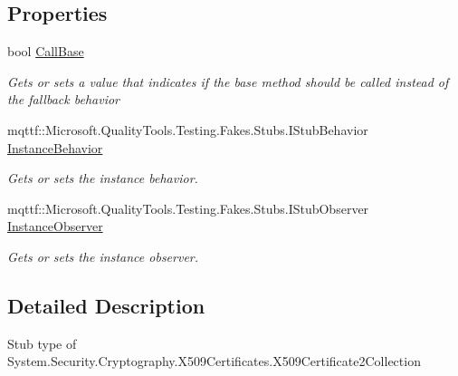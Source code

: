 \subsection*{Properties}
\begin{DoxyCompactItemize}
\item 
bool \hyperlink{class_system_1_1_security_1_1_cryptography_1_1_x509_certificates_1_1_fakes_1_1_stub_x509_certificate2_collection_a594284e1a92cb30adba39edc451be699}{Call\-Base}
\begin{DoxyCompactList}\small\item\em Gets or sets a value that indicates if the base method should be called instead of the fallback behavior\end{DoxyCompactList}\item 
mqttf\-::\-Microsoft.\-Quality\-Tools.\-Testing.\-Fakes.\-Stubs.\-I\-Stub\-Behavior \hyperlink{class_system_1_1_security_1_1_cryptography_1_1_x509_certificates_1_1_fakes_1_1_stub_x509_certificate2_collection_af9fc8c554397ab62fa9246ea78c1a439}{Instance\-Behavior}
\begin{DoxyCompactList}\small\item\em Gets or sets the instance behavior.\end{DoxyCompactList}\item 
mqttf\-::\-Microsoft.\-Quality\-Tools.\-Testing.\-Fakes.\-Stubs.\-I\-Stub\-Observer \hyperlink{class_system_1_1_security_1_1_cryptography_1_1_x509_certificates_1_1_fakes_1_1_stub_x509_certificate2_collection_a963d4f1a7d1c641546b5ad6cb11c3e79}{Instance\-Observer}
\begin{DoxyCompactList}\small\item\em Gets or sets the instance observer.\end{DoxyCompactList}\end{DoxyCompactItemize}


\subsection{Detailed Description}
Stub type of System.\-Security.\-Cryptography.\-X509\-Certificates.\-X509\-Certificate2\-Collection



